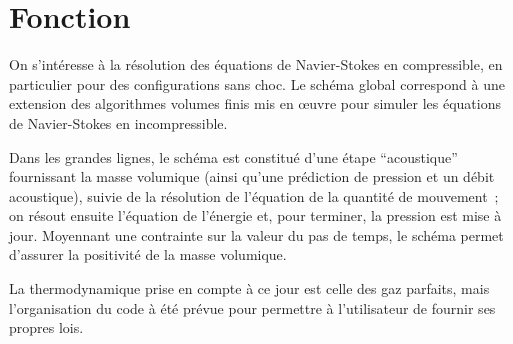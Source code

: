 
%
%
%
%


\label{ap:cfbase}

\section*{Fonction}


On s'intéresse à la résolution des équations de Navier-Stokes en compressible,
en particulier pour des configurations sans choc. Le schéma global correspond à une
extension des algorithmes volumes finis mis en \oe uvre pour simuler les
équations de Navier-Stokes en incompressible.

Dans les grandes lignes, le sch\'ema est constitu\'e d'une \'etape
``acoustique'' fournissant la masse volumique (ainsi qu'une pr\'ediction de
pression et un d\'ebit acoustique), suivie de la r\'esolution de l'\'equation de
la quantit\'e de mouvement~; on r\'esout ensuite l'\'equation de l'\'energie
et, pour terminer, la pression est mise \`a jour.
Moyennant une contrainte sur la valeur du pas de temps, le sch\'ema permet
d'assurer la positivit\'e de la masse volumique.

La thermodynamique prise en compte \`a ce jour est celle des gaz parfaits, mais
l'organisation du code \`a \'et\'e  pr\'evue pour permettre \`a l'utilisateur de
fournir ses propres lois.


